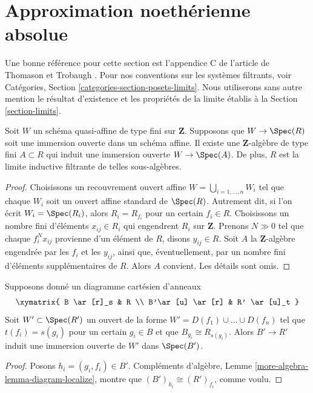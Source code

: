 \section{Approximation noethérienne absolue}
\label{section-approximation}

\noindent
Une bonne référence pour cette section est l'appendice C de l'article de
Thomason et Trobaugh \cite{TT}. Pour nos conventions sur les systèmes
filtrants, voir Catégories, Section \ref{categories-section-posets-limits}.
Nous utiliserons sans autre mention le résultat d'existence et les propriétés
de la limite établis à la Section \ref{section-limits}.

\begin{lemma}
\label{lemma-quasi-affine-finite-type-over-Z}
Soit $W$ un schéma quasi-affine de type fini sur $\mathbf{Z}$. Supposons que
$W \to \Spec(R)$ soit une immersion ouverte dans un schéma affine. Il existe
une $\mathbf{Z}$-algèbre de type fini $A \subset R$ qui induit une immersion
ouverte $W \to \Spec(A)$. De plus, $R$ est la limite inductive filtrante de
telles sous-algèbres.
\end{lemma}

\begin{proof}
Choisissons un recouvrement ouvert affine
$W = \bigcup_{i = 1, \ldots, n} W_i$ tel que chaque $W_i$ soit un ouvert
affine standard de $\Spec(R)$. Autrement dit, si l'on écrit
$W_i = \Spec(R_i)$, alors $R_i = R_{f_i}$ pour un certain $f_i \in R$.
Choisissons un nombre fini d'éléments $x_{ij} \in R_i$ qui engendrent $R_i$
sur $\mathbf{Z}$. Prenons $N \gg 0$ tel que chaque $f_i^Nx_{ij}$ provienne
d'un élément de $R$, disons $y_{ij} \in R$. Soit $A$ la
$\mathbf{Z}$-algèbre engendrée par les $f_i$ et les $y_{ij}$, ainsi que,
éventuellement, par un nombre fini d'éléments supplémentaires de $R$.
Alors $A$ convient. Les détails sont omis.
\end{proof}

\begin{lemma}
\label{lemma-diagram}
Supposons donné un diagramme cartésien d'anneaux
$$
\xymatrix{
B \ar[r]_s & R \\
B'\ar[u] \ar[r] & R' \ar[u]_t
}
$$
Soit $W' \subset \Spec(R')$ un ouvert de la forme
$W' = D(f_1) \cup \ldots \cup D(f_n)$ tel que $t(f_i) = s(g_i)$ pour un
certain $g_i \in B$ et que $B_{g_i} \cong R_{s(g_i)}$. Alors $B' \to R'$
induit une immersion ouverte de $W'$ dans $\Spec(B')$.
\end{lemma}

\begin{proof}
Posons $h_i = (g_i, f_i) \in B'$. Compléments d'algèbre,
Lemme \ref{more-algebra-lemma-diagram-localize}, montre que
$(B')_{h_i} \cong (R')_{f_i}$, comme voulu.
\end{proof}

